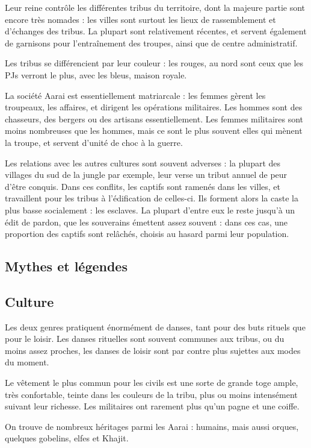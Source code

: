 \documentclass[10pt,a4paper]{book}
\begin{document}
Leur reine contrôle les différentes tribus du territoire, dont la majeure partie sont encore très nomades : les villes sont surtout les lieux de rassemblement et d'échanges des tribus. La plupart sont relativement récentes, et servent également de garnisons pour l'entraînement des troupes, ainsi que de centre administratif.

Les tribus se différencient par leur couleur : les rouges, au nord sont ceux que les PJs verront le plus, avec les bleus, maison royale.

La société Aarai est essentiellement matriarcale : les femmes gèrent les troupeaux, les affaires, et dirigent les opérations militaires. Les hommes sont des chasseurs, des bergers ou des artisans essentiellement. Les femmes militaires sont moins nombreuses que les hommes, mais ce sont le plus souvent elles qui mènent la troupe, et servent d'unité de choc à la guerre.

Les relations avec les autres cultures sont souvent adverses : la plupart des villages du sud de la jungle par exemple, leur verse un tribut annuel de peur d'être conquis. Dans ces conflits, les captifs sont ramenés dans les villes, et travaillent pour les tribus à l'édification de celles-ci. Ils forment alors la caste la plus basse socialement : les esclaves. La plupart d'entre eux le reste jusqu'à un édit de pardon, que les souverains émettent assez souvent : dans ces cas, une proportion des captifs sont relâchés, choisis au hasard parmi leur population.
\subsection{Mythes et légendes}
\subsection{Culture}
Les deux genres pratiquent énormément de danses, tant pour des buts rituels que pour le loisir. Les danses rituelles sont souvent communes aux tribus, ou du moins assez proches, les danses de loisir sont par contre plus sujettes aux modes du moment.

Le vêtement le plus commun pour les civils est une sorte de grande toge ample, très confortable, teinte dans les couleurs de la tribu, plus ou moins intensément suivant leur richesse. Les militaires ont rarement plus qu'un pagne et une coiffe.

On trouve de nombreux héritages parmi les Aarai : humains, mais aussi orques, quelques gobelins, elfes et Khajit.
\end{document}
